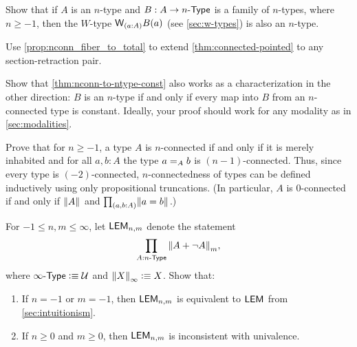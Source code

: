 \begin{ex}\label{ex:ntypes-closed-under-wtypes}
  Show that if $A$ is an $n$-type and $B:A\to \ntype{n}$ is a family of $n$-types, where $n\ge -1$, then the $W$-type $\wtype{a:A} B(a)$ (see \cref{sec:w-types}) is also an $n$-type.
\end{ex}

\begin{ex}\label{ex:connected-pointed-all-section-retraction}
  Use \cref{prop:nconn_fiber_to_total} to extend \cref{thm:connected-pointed} to any section-retraction pair.
\end{ex}

\begin{ex}\label{ex:ntype-from-nconn-const}
  Show that \cref{thm:nconn-to-ntype-const} also works as a characterization in the other direction: $B$ is an $n$-type if and only if every map into $B$ from an $n$-con\-nect\-ed type is constant.
  Ideally, your proof should work for any modality as in \cref{sec:modalities}.
\end{ex}

\begin{ex}\label{ex:connectivity-inductively}
  Prove that for $n\ge -1$, a type $A$ is $n$-connected if and only if it is merely inhabited and for all $a,b:A$ the type $\id[A]ab$ is $(n-1)$-connected.
  Thus, since every type is $(-2)$-connected, $n$-connectedness of types can be defined inductively using only propositional truncations.
  (In particular, $A$ is 0-connected if and only if $\brck{A}$ and $\prd{a,b:A} \brck{a=b}$.)
\end{ex}

\begin{ex}\label{ex:lemnm}
  For $-1\le n,m \le\infty$, let $\LEM{n,m}$ denote the statement
  \[ \prd{A:\ntype{n}} \trunc m{A + \neg A},\]
  where $\ntype{\infty} \defeq \type$ and $\trunc{\infty}{X}\defeq X$.
  Show that:
  \begin{enumerate}
  \item If $n=-1$ or $m=-1$, then $\LEM{n,m}$ is equivalent to $\LEM{}$ from \cref{sec:intuitionism}.
  \item If $n\ge 0$ and $m\ge 0$, then $\LEM{n,m}$ is inconsistent with univalence.
  \end{enumerate}
\end{ex}

